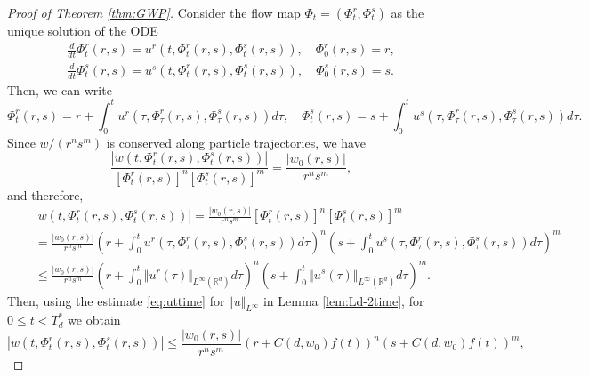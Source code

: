 \documentclass[11pt]{amsart}
\theoremstyle{definition}
\theoremstyle{remark}
\numberwithin{equation}{section}
\numberwithin{equation}{section}
\newcommand{\nrm}[1]{\Vert#1\Vert}
\newcommand{\0}{\emptyset}
\newcommand{\ift}{\infty}
\newcommand{\bbR}{\mathbb R}
\begin{document}
\begin{proof}[Proof of Theorem \ref{thm:GWP}]
		Consider the flow map $\Phi_{t}=(\Phi_{t}^{r},\Phi_{t}^{s})$ as the unique solution of the ODE
		\begin{equation}
			\begin{aligned}
				\frac{d}{dt}\Phi_{t}^{r}(r,s)=u^{r}(t,\Phi_{t}^{r}(r,s),\Phi_{t}^{s}(r,s)),\quad \Phi_{0}^{r}(r,s)=r,\\
				\frac{d}{dt}\Phi_{t}^{s}(r,s)=u^{s}(t,\Phi_{t}^{r}(r,s),\Phi_{t}^{s}(r,s)),\quad \Phi_{0}^{s}(r,s)=s.
			\end{aligned}
		\end{equation}
		Then, we can write 
		\begin{equation}
			\Phi_{t}^{r}(r,s)=r+\int_{0}^{t}u^{r}(\tau,\Phi_{\tau}^{r}(r,s),\Phi_{\tau}^{s}(r,s))d\tau,\quad \Phi_{t}^{s}(r,s)=s+\int_{0}^{t}u^{s}(\tau,\Phi_{\tau}^{r}(r,s),\Phi_{\tau}^{s}(r,s))d\tau.
		\end{equation}
		Since $w/(r^ns^m)$ is conserved along particle trajectories, we have
		\begin{equation}
			\frac{|w(t,\Phi_{t}^{r}(r,s),\Phi_{t}^{s}(r,s))|}{[\Phi_{t}^{r}(r,s)]^{n}[\Phi_{t}^{s}(r,s)]^{m}}=\frac{|w_{0}(r,s)|}{r^{n}s^{m}},
		\end{equation}
		and therefore,
		\begin{equation}\label{eq:wtPhit}
			\begin{aligned}
				&|w(t,\Phi_{t}^{r}(r,s),\Phi_{t}^{s}(r,s))|=\frac{|w_{0}(r,s)|}{r^{n}s^{m}}[\Phi_{t}^{r}(r,s)]^{n}[\Phi_{t}^{s}(r,s)]^{m}\\
				\quad&=\frac{|w_{0}(r,s)|}{r^{n}s^{m}}\left(r+\int_{0}^{t}u^{r}(\tau,\Phi_{\tau}^{r}(r,s),\Phi_{\tau}^{s}(r,s))d\tau\right)^{n}\left(s+\int_{0}^{t}u^{s}(\tau,\Phi_{\tau}^{r}(r,s),\Phi_{\tau}^{s}(r,s))d\tau\right)^{m}\\
				&\leq\frac{|w_{0}(r,s)|}{r^{n}s^{m}}\left(r+\int_{0}^{t}\nrm{u^{r}(\tau)}_{L^{\ift}(\bbR^{d})}d\tau\right)^{n}\left(s+\int_{0}^{t}\nrm{u^{s}(\tau)}_{L^{\ift}(\bbR^{d})}d\tau\right)^{m}.
			\end{aligned}
		\end{equation}
		Then, using the estimate \eqref{eq:uttime} for $\nrm{u}_{L^{\ift}}$ in Lemma \ref{lem:Ld-2time},  for $0\le t<T^*_d$ we obtain
		\begin{equation}
			|w(t,\Phi_{t}^{r}(r,s),\Phi_{t}^{s}(r,s))|\leq\frac{|w_{0}(r,s)|}{r^{n}s^{m}}\left(r+C(d,w_{0})f(t)\right)^{n}\left(s+C(d,w_{0})f(t)\right)^{m},
		\end{equation}

\end{proof}
\end{document}
